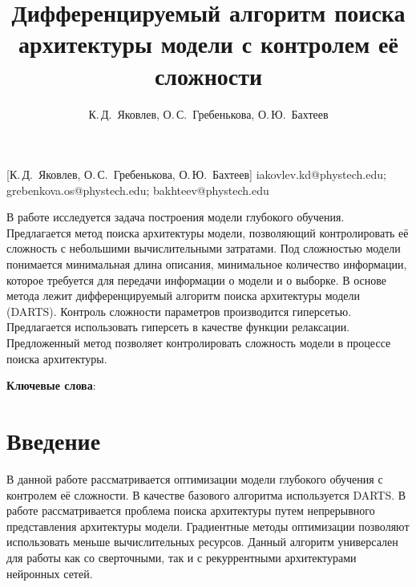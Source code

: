 \documentclass[12pt, twoside]{article}
\begin{document}
\title
    [Дифференцируемый алгоритм поиска архитектуры модели с контролем её сложности] %
    {Дифференцируемый алгоритм поиска архитектуры модели с контролем её сложности}
\author
    [К.\,Д.~Яковлев, О.\,С.~Гребенькова, О.\,Ю.~Бахтеев] %
    {К.\,Д.~Яковлев, О.\,С.~Гребенькова, О.\,Ю.~Бахтеев} %
    [К.\,Д.~Яковлев, О.\,С.~Гребенькова, О.\,Ю.~Бахтеев] %
\email
    { iakovlev.kd@phystech.edu; grebenkova.os@phystech.edu; bakhteev@phystech.edu}

\abstract
    {В работе исследуется задача построения модели глубокого обучения. Предлагается метод поиска архитектуры модели, позволяющий контролировать её сложность с небольшими вычислительными затратами. Под сложностью модели понимается минимальная длина описания,
минимальное количество информации, которое требуется для передачи информации о модели и о выборке. В основе метода лежит дифференцируемый алгоритм поиска архитектуры модели (DARTS). Контроль сложности параметров производится гиперсетью. Предлагается использовать гиперсеть в качестве функции релаксации. Предложенный метод позволяет контролировать сложность модели в процессе поиска архитектуры.
	
\bigskip
\noindent
\textbf{Ключевые слова}: \emph {}
}





\maketitle
\linenumbers

\section{Введение}

В данной работе рассматривается оптимизации модели глубокого обучения с контролем её сложности. В качестве базового алгоритма используется DARTS. В работе \cite{journals/corr/abs-1806-09055} рассматривается проблема поиска архитектуры путем непрерывного представления архитектуры модели. Градиентные методы оптимизации позволяют использовать меньше вычислительных ресурсов. Данный алгоритм универсален для работы как со сверточными, так и с рекуррентными архитектурами нейронных сетей.
\end{document}
